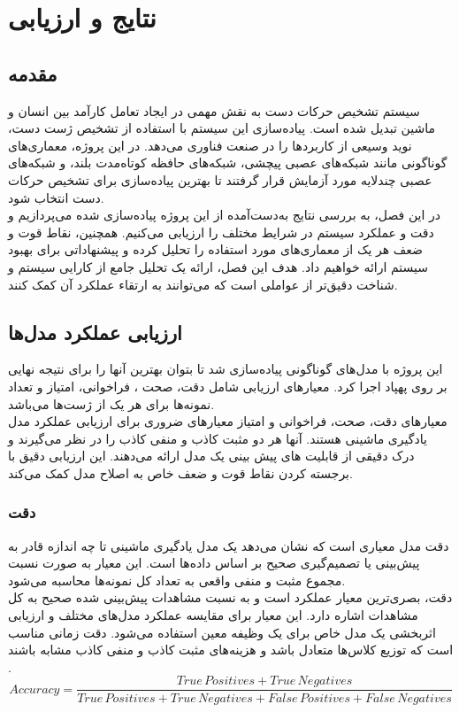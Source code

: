 \chapter{نتایج و ارزیابی}
\section{مقدمه}
سیستم تشخیص حرکات دست به نقش مهمی در ایجاد تعامل کارآمد بین انسان و ماشین تبدیل شده است. پیاده‌سازی این سیستم با استفاده از تشخیص ژست دست، نوید وسیعی از کاربردها را در صنعت فناوری می‌دهد. در این پروژه، 
معماری‌های گوناگونی مانند شبکه‌های عصبی پیچشی، شبکه‌های حافظه کوتاه‌مدت بلند، و شبکه‌های عصبی چندلایه مورد آزمایش قرار گرفتند تا بهترین پیاده‌سازی برای تشخیص حرکات دست انتخاب شود. 
\\
در این فصل، به بررسی نتایج به‌دست‌آمده از این پروژه پیاده‌سازی شده می‌پردازیم و دقت و عملکرد سیستم در شرایط مختلف را ارزیابی می‌کنیم. همچنین، نقاط قوت و ضعف هر یک از معماری‌های مورد استفاده 
را تحلیل کرده و پیشنهاداتی برای بهبود سیستم ارائه خواهیم داد. هدف این فصل، ارائه یک تحلیل جامع از کارایی سیستم و شناخت دقیق‌تر از عواملی است که می‌توانند به ارتقاء عملکرد آن کمک کنند.


\section{ارزیابی عملکرد مدل‌ها}

این پروژه با مدل‌های گوناگونی پیاده‌سازی شد تا بتوان بهترین آنها را برای نتیجه نهایی بر روی پهپاد اجرا کرد. معیارهای ارزیابی شامل دقت، صحت ، فراخوانی، امتیاز  و
تعداد نمونه‌ها برای هر یک از ژست‌ها می‌باشد.
\\
معیار‌های دقت، صحت، فراخوانی و امتیاز  معیارهای ضروری برای ارزیابی عملکرد مدل یادگیری ماشینی هستند. آنها هر دو مثبت کاذب و منفی کاذب را در نظر
می‌گیرند و درک دقیقی از قابلیت های پیش بینی یک مدل ارائه می‌دهند. این ارزیابی دقیق با برجسته کردن نقاط قوت و ضعف خاص به اصلاح مدل کمک می‌کند.


\subsection{دقت}
دقت مدل معیاری است که نشان می‌دهد یک مدل یادگیری ماشینی تا چه اندازه قادر به پیش‌بینی یا تصمیم‌گیری صحیح بر اساس داده‌ها است. این معیار به صورت نسبت مجموع مثبت و منفی واقعی به تعداد کل نمونه‌ها محاسبه می‌شود.
\\
دقت، بصری‌ترین معیار عملکرد است و به نسبت مشاهدات پیش‌بینی شده صحیح به کل مشاهدات اشاره دارد. این معیار برای مقایسه عملکرد مدل‌های مختلف و ارزیابی اثربخشی یک مدل خاص برای یک وظیفه معین استفاده می‌شود. دقت زمانی مناسب است که توزیع کلاس‌ها متعادل باشد و هزینه‌های مثبت کاذب و منفی کاذب مشابه باشند \cite{Accuracy53:online}.
\[ Accuracy = \frac{True \, Positives + True \, Negatives}{True \, Positives + True \, Negatives + False \, Positives + False \, Negatives} \]


